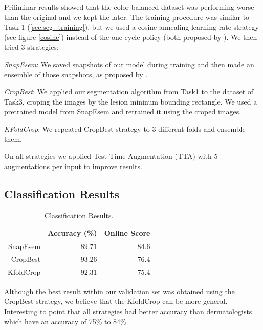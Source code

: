 \documentclass[conference]{IEEEtran}
\begin{document}
Priliminar results showed that the color balanced dataset was performing worse than the original and we kept the later. The training procedure was similar to Task 1 (\ref{sec:seg_training}), but we used a cosine annealing learning rate strategy (see figure \ref{cosine}) instead of the one cycle policy (both proposed by \cite{leslie}). We then tried 3 strategies:

\emph{SnapEsem}: We saved snapshots of our model during training and then made an ensemble of those snapshots, as proposed by \cite{snapshots}.

\emph{CropBest}: We applied our segmentation algorithm from Task1 to the dataset of Task3, croping the images by the lesion mininum bounding rectangle. We used a pretrained model from SnapEsem and retrained it using the croped images.

\emph{KFoldCrop}: We repeated CropBest strategy to 3 different folds and ensemble them. 

On all strategies we applied Test Time Augmentation (TTA) with 5 augmentations per input to improve results.

\subsection{Classification Results}

\begin{table}[]
\centering
\caption{Classification Results.}
\label{tabela}
\begin{tabular}{@{}rrr@{}}
\toprule
            & \multicolumn{1}{c}{Accuracy (\%)} & \multicolumn{1}{c}{Online Score} \\ \midrule
SnapEsem & \(89.71\)& \(84.6\)                                  \\ \midrule
CropBest   & \(93.26\)&  \(76.4\)                                \\ \midrule
KfoldCrop    & \(92.31\)  & \(75.4\)                              \\ \bottomrule
\end{tabular}
\end{table}

Although the best result within our validation set was obtained using the CropBest strategy, we believe that the KfoldCrop can be more general. Interesting to point that all strategies had better accuracy than dermatologists which have an accuracy of 75\% to 84\%\cite{isic}. 
\end{document}
